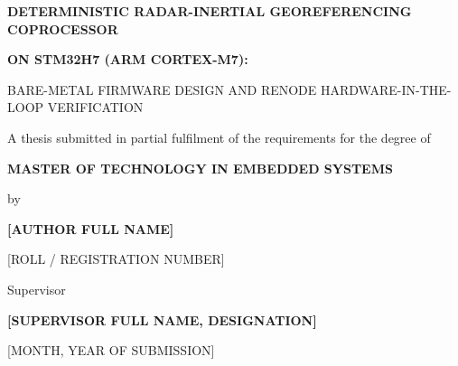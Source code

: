 \begin{titlepage}
\centering
\thispagestyle{empty}

\vspace*{0.5cm}
{\large\bfseries DETERMINISTIC RADAR-INERTIAL GEOREFERENCING COPROCESSOR\par}
\vspace{0.15cm}
{\large\bfseries ON STM32H7 (ARM CORTEX-M7):\par}
\vspace{0.15cm}
{\normalsize BARE-METAL FIRMWARE DESIGN AND RENODE HARDWARE-IN-THE-LOOP VERIFICATION\par}

\vspace{2.2cm}
{\normalsize A thesis submitted in partial fulfilment of the requirements for the degree of\par}
\vspace{0.3cm}
{\large\bfseries MASTER OF TECHNOLOGY IN EMBEDDED SYSTEMS\par}

\vspace{1.6cm}
{\normalsize by\par}
\vspace{0.25cm}
{\large\bfseries [AUTHOR FULL NAME]\par}
\vspace{0.15cm}
{\normalsize [ROLL / REGISTRATION NUMBER]\par}

\vspace{1.6cm}
{\normalsize Supervisor\par}
\vspace{0.2cm}
{\large\bfseries [SUPERVISOR FULL NAME, DESIGNATION]\par}

\vfill
{\normalsize [MONTH, YEAR OF SUBMISSION]\par}
\vspace{0.3cm}

\end{titlepage}